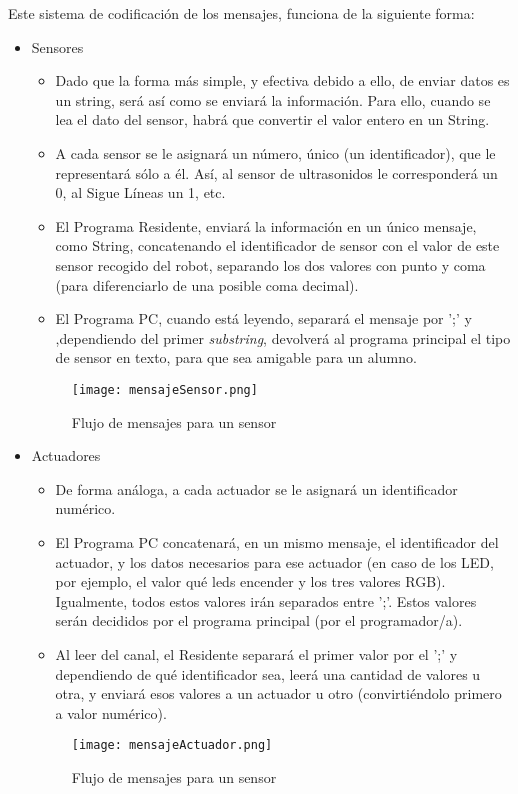 Este sistema de codificación de los mensajes, funciona de la siguiente forma:
\begin{itemize}
	\item Sensores
	\begin{itemize}			
		\item Dado que la forma más simple, y efectiva debido a ello, de enviar datos es un string, será así como se enviará la información. Para ello, cuando se lea el dato del sensor, habrá que convertir el valor entero en un String. 
		\item A cada sensor se le asignará un número, único (un identificador), que le representará sólo a él. Así, al sensor de ultrasonidos le corresponderá un 0, al Sigue Líneas un 1, etc. 
		\item El Programa Residente, enviará la información en un único mensaje, como String, concatenando el identificador de sensor con el valor de este sensor recogido del robot, separando los dos valores con punto y coma (para diferenciarlo de una posible coma decimal).
		\item El Programa PC, cuando está leyendo, separará el mensaje por ';' y ,dependiendo del primer \textit{substring}, devolverá al programa principal el tipo de sensor en texto, para que sea amigable para un alumno. 
	\end{itemize}
	\begin{figure}[h]
		\texttt{[image: mensajeSensor.png]}
		\centering
		\label{img:mensajeSensor}
		\caption{Flujo de mensajes para un sensor}
	\end{figure}
	\item Actuadores
	\begin{itemize}
		\item De forma análoga, a cada actuador se le asignará un identificador numérico.
		\item El Programa PC concatenará, en un mismo mensaje, el identificador del actuador, y los datos necesarios para ese actuador (en caso de los LED, por ejemplo, el valor qué leds encender y los tres valores RGB). Igualmente, todos estos valores irán separados entre ';'. Estos valores serán decididos por el programa principal (por el programador/a).
		\item Al leer del canal, el Residente separará el primer valor por el ';' y dependiendo de qué identificador sea, leerá una cantidad de valores u otra, y enviará esos valores a un actuador u otro (convirtiéndolo primero a valor numérico).
	\end{itemize}
\begin{figure}[h]
	\texttt{[image: mensajeActuador.png]}
	\centering
	\label{img:mensajeActuador}
	\caption{Flujo de mensajes para un sensor}
\end{figure}
\end{itemize}


